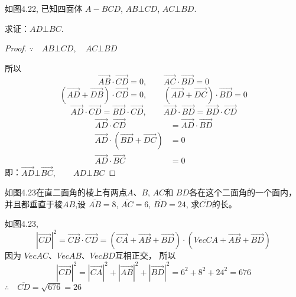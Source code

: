 \begin{example}
    如图4.22, 已知四面体
$A-BCD$, $AB\bot CD$, $AC\bot BD$.

求证：$AD\bot BC$.
\end{example}

\begin{proof}
    $\because\quad AB\bot CD,\quad AC\bot BD$

    所以
\[    \Vec{AB}\cdot \Vec{CD}=0,\qquad    \Vec{AC}\cdot \Vec{BD}=0\]
\[\left(\Vec{AD}+\Vec{DB}\right)\cdot \Vec{CD}=0,\qquad    \left(\Vec{AD}+\Vec{DC}\right)\cdot \Vec{BD}=0\]
\[\Vec{AD}\cdot \Vec{CD}=\Vec{BD}\cdot \Vec{CD},\qquad \Vec{AD}\cdot \Vec{BD}=\Vec{BD}\cdot \Vec{CD}\]
\[\begin{split}
    \Vec{AD}\cdot \Vec{CD}&=\Vec{AD}\cdot \Vec{BD}
    \\
    \Vec{AD}\cdot \left(\Vec{BD}+\Vec{DC}\right)&=0\\
    \Vec{AD}\cdot \Vec{BC}&=0
\end{split}\]
即：$\Vec{AD}\bot \Vec{BC},\qquad AD\bot BC$
\end{proof}


\begin{example}
    如图4.23在直二面角的棱上有两点$A$、$B$, $AC$和
    $BD$各在这个二面角的一个面内，并且都垂直于棱$AB$,设
    $\overline{AB}=8$, $\overline{AC}=6$, $\overline{BD}=24$, 求$\overline{CD}$的长。
\end{example}

\begin{solution}    
 如图4.23, 
\[|\Vec{CD}|^2=\Vec{CB}\cdot \Vec{CD}=\left(\Vec{CA}+\Vec{AB}+\Vec{BD}\right)\cdot \left(Vec{CA}+\Vec{AB}+\Vec{BD}\right)\]
因为
$Vec{AC}$、$Vec{AB}$、$Vec{BD}$互相正交，
所以
\[|\Vec{CD}|^2=|\Vec{CA}|^2+|\Vec{AB}|^2+|\Vec{BD}|^2=6^2+8^2+24^2=676\]
$\therefore\quad \overline{CD}=\sqrt{676}=26$
\end{solution}

